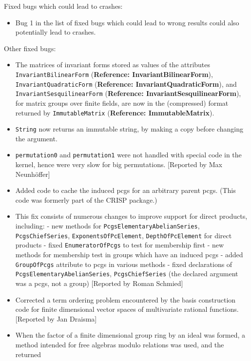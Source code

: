 \documentclass[a4paper,11pt]{report}
\begin{document}
{{\begin{itemize}
\end{itemize}
 Fixed bugs which could lead to crashes: 
\begin{itemize}
\item  Bug 1 in the list of fixed bugs which could lead to wrong results could also
potentially lead to crashes. 
\end{itemize}
 Other fixed bugs: 
\begin{itemize}
\item  The matrices of invariant forms stored as values of the attributes \texttt{InvariantBilinearForm} (\textbf{Reference: InvariantBilinearForm}), \texttt{InvariantQuadraticForm} (\textbf{Reference: InvariantQuadraticForm}), and \texttt{InvariantSesquilinearForm} (\textbf{Reference: InvariantSesquilinearForm}), for matrix groups over finite fields, are now in the (compressed) format
returned by \texttt{ImmutableMatrix} (\textbf{Reference: ImmutableMatrix}). 
\item  \texttt{String} now returns an immutable string, by making a copy before changing the
argument. 
\item  \texttt{permutation\texttt{}0} and \texttt{permutation\texttt{}1} were not handled with special code in the kernel, hence were very slow for big
permutations. [Reported by Max Neunh{\"o}ffer] 
\item  Added code to cache the induced pcgs for an arbitrary parent pcgs. (This code
was formerly part of the \textsf{CRISP} package.) 
\item  This fix consists of numerous changes to improve support for direct products,
including: - new methods for \texttt{PcgsElementaryAbelianSeries}, \texttt{PcgsChiefSeries}, \texttt{ExponentsOfPcElement}, \texttt{DepthOfPcElement} for direct products - fixed \texttt{EnumeratorOfPcgs} to test for membership first - new methods for membership test in groups which
have an induced pcgs - added \texttt{GroupOfPcgs} attribute to pcgs in various methods - fixed declarations of \texttt{PcgsElementaryAbelianSeries}, \texttt{PcgsChiefSeries} (the declared argument was a pcgs, not a group) [Reported by Roman Schmied] 
\item  Corrected a term ordering problem encountered by the basis construction code
for finite dimensional vector spaces of multivariate rational functions.
[Reported by Jan Draisma] 
\item  When the factor of a finite dimensional group ring by an ideal was formed, a
method intended for free algebras modulo relations was used, and the returned

\end{itemize}}}
\end{document}
